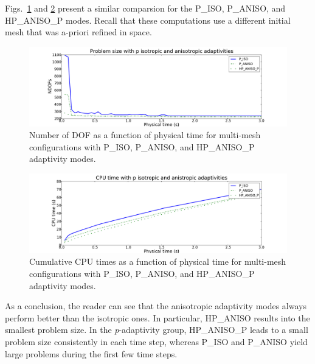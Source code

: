\noindent
Figs.~\ref{fig:isoanisopdof} and \ref{fig:isoanisopcpu} present a similar 
comparsion for the P\_ISO, P\_ANISO, and HP\_ANISO\_P modes. Recall that these 
computations use a different initial mesh that was a-priori refined in space.


\begin{figure}[!ht]
  \begin{centering}
  \includegraphics[width=\columnwidth]{isoanisop_dof}
  \caption{\label{fig:isoanisopdof} Number of DOF as a function of physical time
  for multi-mesh configurations with P\_ISO, P\_ANISO, and
  HP\_ANISO\_P adaptivity modes.}
  \end{centering}
\end{figure}

\begin{figure}[!ht]
  \begin{centering}
  \includegraphics[width=\columnwidth]{isoanisop_cpu}
  \caption{\label{fig:isoanisopcpu} Cumulative CPU times as a function of physical time
  for multi-mesh configurations with P\_ISO, P\_ANISO, and
  HP\_ANISO\_P adaptivity modes.}
  \end{centering}
\end{figure}

As a conclusion, the reader can see that the anisotropic adaptivity modes always perform better than 
the isotropic ones. In particular, HP\_ANISO results into the smallest problem size. 
In the \emph{p}-adaptivity group, HP\_ANISO\_P leads to a small problem size
consistently in each time step, whereas P\_ISO and P\_ANISO yield large problems
during the first few time steps. 

